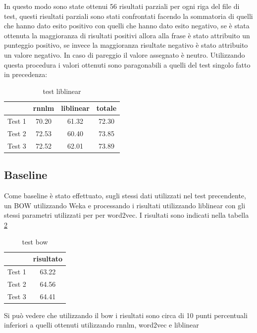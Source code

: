 \documentclass[a4paper,12pt,openright,twoside]{report}
\theoremstyle{definition}
\begin{document}
In questo modo sono state ottenui 56 risultati parziali per ogni riga del file di test, questi risultati parziali sono stati confrontati facendo la sommatoria di quelli che hanno dato esito positivo con quelli che hanno dato esito negativo, se è stata ottenuta la maggioranza di risultati positivi allora alla frase è stato attribuito un punteggio positivo, se invece la maggioranza risultate negativo è stato attribuito un valore negativo. In caso di pareggio il valore assegnato è neutro.
Utilizzando questa procedura i valori ottenuti sono paragonabili a quelli del  test singolo fatto in precedenza:
\begin{table}[h]
\begin{center}
\begin{tabular}{|c|c|c|c|}
\hline
& rnnlm & liblinear & totale \\
\hline
\hline
Test 1 & 70.20 & 61.32 & 72.30 \\
\hline
Test 2 & 72.53 & 60.40 & 73.85  \\
\hline
Test 3 & 72.52 & 62.01 & 73.89 \\
\hline
\end{tabular}
\end{center}
\caption{test liblinear}
\label{tab:test3}
\end{table}
\fi
\subsection{Baseline}
Come baseline è stato effettuato, sugli stessi dati utilizzati nel test precendente, un BOW utilizzando Weka e processando i risultati utilizzando liblinear con gli stessi parametri utilizzati per per word2vec. I risultati sono indicati nella tabella \ref{tab:baseTest1}
\begin{table}[h]
\begin{center}
\begin{tabular}{|c|c|}
\hline
& risultato  \\
\hline
\hline
Test 1 & 63.22 \\
\hline
Test 2 & 64.56 \\
\hline
Test 3 & 64.41 \\
\hline
\end{tabular}
\end{center}
\caption{test bow}
\label{tab:baseTest1}
\end{table}

Si può vedere che utilizzando il bow i risultati sono circa di 10 punti percentuali inferiori a quelli ottenuti utilizzando rnnlm, word2vec e liblinear
\end{document}
